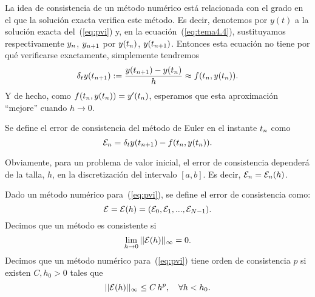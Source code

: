 La idea de consistencia de un método numérico está relacionada con el
grado en el que la solución exacta verifica este método. Es decir,
denotemos por $y(t)$ a la solución exacta del~(\ref{eq:pvi}) y, en la
ecuación~(\ref{eq:tema4.4}), sustituyamos  respectivamente
${y_n}$, ${y_{n+1}}$ por $y({t_n})$, $y({t_{n+1}})$. Entonces esta ecuación no tiene por qué verificarse exactamente, simplemente tendremos
\begin{equation*}
  \delta_t y({t_{n+1}}) :=
  \frac{y({t_{n+1}})-y({t_n})}{h} \approx f({t_n},y({t_n})).
\end{equation*}
Y de hecho, como $f({t_n},y({t_n}))=y'({t_n})$, esperamos que esta aproximación ``mejore'' cuando $h\to 0$.
\begin{definition}
  \label{def:error-consistencia-euler}
  Se define el error de consistencia del método de Euler en el
  instante ${t_n}$ como
  \begin{equation}
    \label{eq:consistencia-euler}
    {\cal E}_n = \delta_t y({t_{n+1}})-f({t_n},y({t_n})).
  \end{equation}
\end{definition}
Obviamente, para un problema de valor inicial, el error de
consistencia dependerá de la talla, $h$, en la discretización del
intervalo $[a,b]$. Es decir, ${\cal E}_n={\cal E}_n(h)$.

\begin{definition}
  \label{def:consitencia-metodo-pvi}
  Dado un método numérico para~(\ref{eq:pvi}), se define el error de consistencia
  como:
  \begin{equation*}
    {\cal E} = {\cal E}(h) = ({\cal E}_0, {\cal E}_1,...,{\cal E}_{N-1}).
  \end{equation*}
  Decimos que un método es consistente si
  \begin{equation*}
    \lim_{h\to 0} ||{\cal E}(h)||_\infty = 0.
  \end{equation*}
  Decimos que un método numérico para~(\ref{eq:pvi}) tiene orden de
  consistencia $p$ si existen $C, h_0>0$ tales que
  \begin{equation*}
    ||{\cal E}(h)||_\infty \le C\, h^p, \quad \forall h<h_0.
  \end{equation*}
\end{definition}

